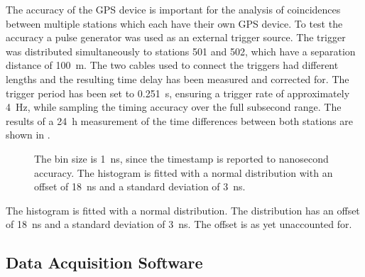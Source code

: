 The accuracy of the GPS device is important for the analysis of coincidences
between multiple stations which each have their own GPS device.  To test the
accuracy a pulse generator was used as an external trigger source.  The
trigger was distributed simultaneously to stations 501 and 502, which have a
separation distance of \SI{100}{\meter}.  The two cables used to connect the
triggers had different lengths and the resulting time delay has been measured
and corrected for.
The trigger period has been set to \SI{0.251}{\second}, ensuring a trigger rate
of approximately \SI{4}{\hertz}, while sampling the timing accuracy over the
full subsecond range.  The results of a \SI{24}{\hour} measurement of the time
differences between both stations are shown in
.
\begin{figure}
\centering

\caption{  The bin size is
\SI{1}{\nano\second}, since the time\-stamp is reported to nanosecond accuracy.
The histogram is fitted with a normal distribution with an offset of
\SI{18}{\nano\second} and a standard deviation of \SI{3}{\nano\second}.}
\label{fig:gps-timing-distribution}
\end{figure}
The histogram is fitted with a normal distribution.  The distribution has an
offset of \SI{18}{\nano\second} and a standard deviation of
\SI{3}{\nano\second}.  The offset is as yet unaccounted for.


\subsection{Data Acquisition Software}

